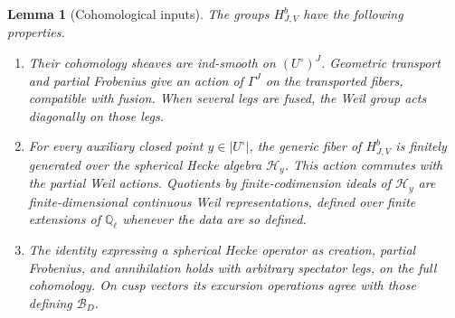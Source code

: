 \documentclass[11pt]{article}
\numberwithin{equation}{section}
\newtheorem{lemma}[theorem]{Lemma}
\theoremstyle{definition}
\theoremstyle{remark}
\newcommand{\Q}{\mathbb Q}
\begin{document}
\begin{lemma}[Cohomological inputs]\label{lem:glob-cohomology}
The groups $H^b_{J,V}$ have the following properties.
\begin{enumerate}[label=\textup{(\roman*)}]
\item Their cohomology sheaves are ind-smooth on $(U^\circ)^J$.
Geometric transport and partial Frobenius give an action of $\Gamma^J$
on the transported fibers, compatible with fusion.  When several legs
are fused, the Weil group acts diagonally on those legs.
\item For every auxiliary closed point $y\in |U^\circ|$, the generic
fiber of $H^b_{J,V}$ is finitely generated over the spherical Hecke
algebra $\mathcal H_y$.  This action commutes with the partial Weil
actions.  Quotients by finite-codimension ideals of $\mathcal H_y$
are finite-dimensional continuous Weil representations, defined over
finite extensions of $\Q_\ell$ whenever the data are so defined.
\item The identity expressing a spherical Hecke operator as creation,
partial Frobenius, and annihilation holds with arbitrary spectator
legs, on the full cohomology.  On cusp vectors its excursion operations
agree with those defining $\mathcal B_D$.
\end{enumerate}
\end{lemma}
\end{document}
